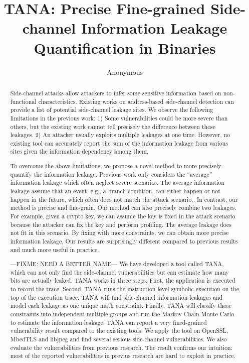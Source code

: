 \documentclass[conference]{IEEEtran}
\newcommand{\tool}{TANA}
\begin{document}
\title{\tool{}: Precise Fine-grained Side-channel Information Leakage Quantification in Binaries}
\author{Anonymous}

\maketitle

\begin{abstract}
Side-channel attacks allow attackers to infer some sensitive 
information based on non-functional characteristics. 
Existing works on address-based side-channel detection 
can provide a list of potential side-channel leakage sites. We observe 
the following limitations in the previous work: 1) 
Some vulnerabilities could be more severe than others, 
but the existing work cannot tell precisely the 
difference between those leakages. 2)  An attacker 
usually exploits multiple leakages at one time. 
However, no existing tool can accurately report
the sum of the information leakage from various
sites given the information dependency among them.
   

To overcome the above limitations, we propose a novel method
to more precisely quantify the information leakage. 
Previous work only considers the
``average'' information leakage 
which often neglect severe scenarios.
The average information leakage assume that an event, e.g., a branch condition,
can either happen or not happen in the future,
which often does not match the attack scenario..
In contrast, our method is precise and fine-grain. 
Our method can also precisely combine two leakages. 
For example, given a crypto key, we can assume the key is fixed
in the attack scenario because the attacker can fix the key and perform profiling.
The average leakage does not fit in this scenario.
By fixing with more constraints, we can obtain 
more precise information leakage.
Our results are surprisingly different 
compared to previous results
and much more useful in practice.

---FIXME: NEED A BETTER NAME---
We have developed a tool called \tool{}, which can not only 
find the side-channel vulnerabilities but can estimate how many bits are actually leaked. 
 \tool{} works in three steps. First, the application is executed to record the 
trace. Second, \tool{} runs the instruction level symbolic execution on the top of the 
execution trace. \tool{} will find side-channel information leakages and model each leakage 
as one unique math constraint. Finally, \tool{} will classify those constraints into 
independent multiple groups and run the Markov Chain Monte Carlo to estimate the 
information leakage. \tool{} can report a very fined-grained vulnerability result 
compared to the existing tools.
We apply the tool on OpenSSL, MbedTLS and libjpeg and find several serious side-channel 
vulnerabilities. We also evaluate the vulnerabilities from previous research. The result 
confirms our intuition: most of the reported vulnerabilities in previus research
are hard to exploit in practice.

\end{abstract}
\end{document}
